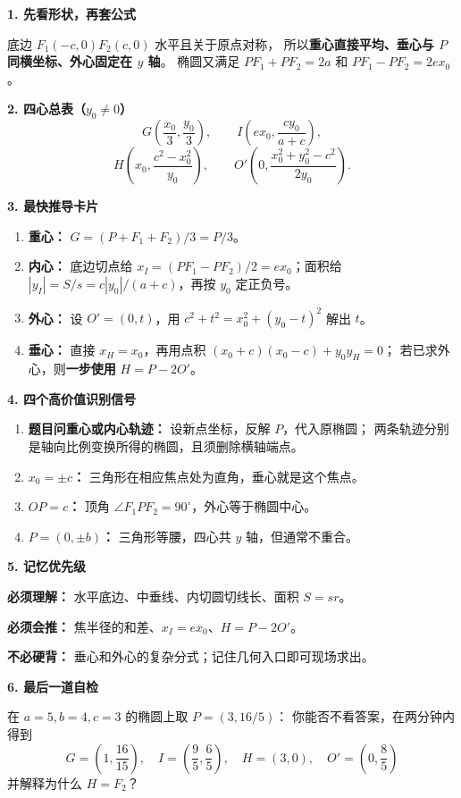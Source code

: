 \begin{summarybox}
\textbf{1. 先看形状，再套公式}

底边 $F_1(-c,0)F_2(c,0)$ 水平且关于原点对称，
所以\textbf{重心直接平均、垂心与 $P$ 同横坐标、外心固定在 $y$ 轴}。
椭圆又满足 $PF_1+PF_2=2a$ 和 $PF_1-PF_2=2ex_0$。

\textbf{2. 四心总表（$y_0\ne0$）}
\[
 \boxed{G\left(\frac{x_0}{3},\frac{y_0}{3}\right)},
 \qquad
 \boxed{I\left(ex_0,\frac{cy_0}{a+c}\right)},
\]
\[
 \boxed{H\left(x_0,\frac{c^2-x_0^2}{y_0}\right)},
 \qquad
 \boxed{O'\left(0,\frac{x_0^2+y_0^2-c^2}{2y_0}\right)}.
\]

\textbf{3. 最快推导卡片}
\begin{enumerate}
 \item \textbf{重心：} $G=(P+F_1+F_2)/3=P/3$。
 \item \textbf{内心：} 底边切点给
 $x_I=(PF_1-PF_2)/2=ex_0$；面积给
 $|y_I|=S/s=c|y_0|/(a+c)$，再按 $y_0$ 定正负号。
 \item \textbf{外心：} 设 $O'=(0,t)$，用
 $c^2+t^2=x_0^2+(y_0-t)^2$ 解出 $t$。
 \item \textbf{垂心：} 直接 $x_H=x_0$，再用点积
 $(x_0+c)(x_0-c)+y_0y_H=0$；
 若已求外心，则\textbf{一步使用} $H=P-2O'$。
\end{enumerate}

\textbf{4. 四个高价值识别信号}
\begin{enumerate}
 \item \textbf{题目问重心或内心轨迹：} 设新点坐标，反解 $P$，代入原椭圆；
 两条轨迹分别是轴向比例变换所得的椭圆，且须删除横轴端点。
 \item \textbf{$x_0=\pm c$：} 三角形在相应焦点处为直角，垂心就是这个焦点。
 \item \textbf{$OP=c$：} 顶角 $\angle F_1PF_2=90^\circ$，外心等于椭圆中心。
 \item \textbf{$P=(0,\pm b)$：} 三角形等腰，四心共 $y$ 轴，但通常不重合。
\end{enumerate}

\textbf{5. 记忆优先级}

\textbf{必须理解：} 水平底边、中垂线、内切圆切线长、面积 $S=sr$。

\textbf{必须会推：} 焦半径的和差、$x_I=ex_0$、$H=P-2O'$。

\textbf{不必硬背：} 垂心和外心的复杂分式；记住几何入口即可现场求出。

\textbf{6. 最后一道自检}

在 $a=5,b=4,c=3$ 的椭圆上取 $P=(3,16/5)$：
你能否不看答案，在两分钟内得到
\[
 G=\left(1,\frac{16}{15}\right),\quad
 I=\left(\frac95,\frac65\right),\quad
 H=(3,0),\quad O'=\left(0,\frac85\right)
\]
并解释为什么 $H=F_2$？
\end{summarybox}
